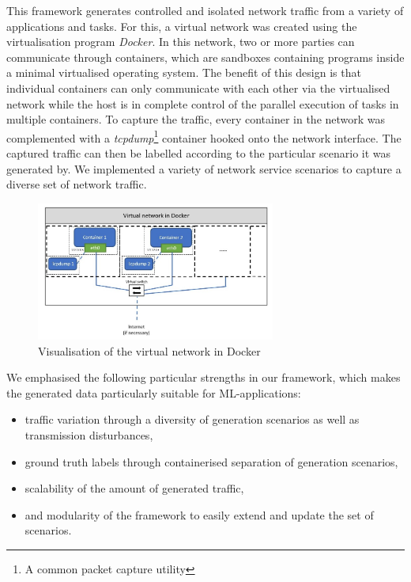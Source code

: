 \documentclass[a4paper,12pt,twoside]{article}
\begin{document}
This framework generates controlled and isolated network traffic from a variety of applications and tasks. For this, a virtual network was created using the virtualisation program \textit{Docker}. In this network, two or more parties can communicate through containers,  which are sandboxes containing programs inside a minimal virtualised operating system. The benefit of this design is that individual containers can only communicate with each other via the virtualised network while the host is in complete control of the parallel execution of tasks in multiple containers. To capture the traffic, every container in the network was complemented with a \textit{tcpdump}\footnote{A common packet capture utility} container hooked onto the network interface. The captured traffic can then be labelled according to the particular scenario it was generated by. We implemented a variety of network service  scenarios to capture a diverse set of network traffic.

\begin{figure}
\centering
\includegraphics[width=0.7\textwidth]{images/Dockernet.jpg}
\caption{Visualisation of the virtual network in Docker}\label{docker}
\end{figure}


We emphasised the following particular strengths in our framework, which makes the generated data particularly suitable for ML-applications:
\begin{itemize}
\item traffic variation through a diversity of generation scenarios as well as transmission disturbances,
\item ground truth labels through containerised separation of generation scenarios,
\item scalability of the amount of generated traffic,
\item and modularity of the framework to easily extend and update the set of scenarios.
\end{itemize}
\end{document}
